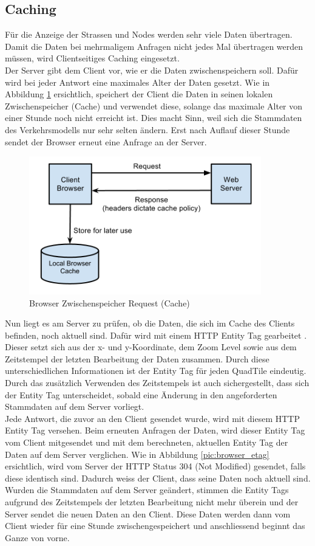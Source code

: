 \subsection{Caching}
Für die Anzeige der Strassen und Nodes werden sehr viele Daten übertragen. Damit die Daten bei mehrmaligem Anfragen nicht jedes Mal übertragen werden müssen, wird Clientseitiges Caching eingesetzt.\\
Der Server gibt dem Client vor, wie er die Daten zwischenspeichern soll. Dafür wird bei jeder Antwort eine maximales Alter der Daten gesetzt. Wie in Abbildung \ref{pic:browser_cache} ersichtlich, speichert der Client die Daten in seinen lokalen Zwischenspeicher (Cache) und verwendet diese, solange das maximale Alter von einer Stunde noch nicht erreicht ist. Dies macht Sinn, weil sich die Stammdaten des Verkehrsmodells nur sehr selten ändern. Erst nach Auflauf dieser Stunde sendet der Browser erneut eine Anfrage an der Server.
\begin{figure}[H]
\centering
\includegraphics[height=6cm]{images/browser_cache.jpg}
\caption{Browser Zwischenspeicher Request (Cache) \cite{HTTPCacheHeaders}}
\label{pic:browser_cache}
\end{figure}
\noindent
Nun liegt es am Server zu prüfen, ob die Daten, die sich im Cache des Clients befinden, noch aktuell sind. Dafür wird mit einem HTTP Entity Tag gearbeitet \cite{WikipediaETag}. Dieser setzt sich aus der x- und y-Koordinate, dem Zoom Level sowie aus dem Zeitstempel der letzten Bearbeitung der Daten zusammen. Durch diese unterschiedlichen Informationen ist der Entity Tag für jeden QuadTile eindeutig. Durch das zusätzlich Verwenden des Zeitstempels ist auch sichergestellt, dass sich der Entity Tag unterscheidet, sobald eine Änderung in den angeforderten Stammdaten auf dem Server vorliegt.\\
Jede Antwort, die zuvor an den Client gesendet wurde, wird mit diesem HTTP Entity Tag versehen. Beim erneuten Anfragen der Daten, wird dieser Entity Tag vom Client mitgesendet und mit dem berechneten, aktuellen Entity Tag der Daten auf dem Server verglichen. Wie in Abbildung \ref{pic:browser_etag} ersichtlich, wird vom Server der HTTP Status 304 (Not Modified) \cite{W3HttpStatus} gesendet, falls diese identisch sind. Dadurch weiss der Client, dass seine Daten noch aktuell sind. Wurden die Stammdaten auf dem Server geändert, stimmen die Entity Tags aufgrund des Zeitstempels der letzten Bearbeitung nicht mehr überein und der Server sendet die neuen Daten an den Client. Diese Daten werden dann vom Client wieder für eine Stunde zwischengespeichert und anschliessend beginnt das Ganze von vorne.
